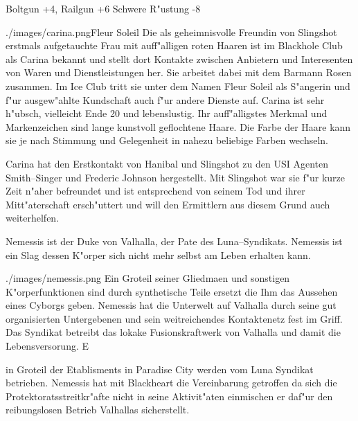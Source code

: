 \begin{nscsheet}[f]{\xls}
    \nscstats[ATT=9,AGG=10,EMP=4,KNO=4,HP=14]
    \nscruler
    \begin{nscinventory}
        \nscitem[Waffen] Boltgun +4, Railgun +6
        \nscitem[R"ustung] Schwere R"ustung -8
    \end{nscinventory}
\end{nscsheet}



\begin{sideimagebox}[r]{0.5}{./images/carina.png}{Fleur Soleil}
    Die als geheimnisvolle Freundin von Slingshot erstmals aufgetauchte Frau mit auff"alligen roten Haaren ist im Blackhole Club als Carina bekannt und stellt dort Kontakte zwischen Anbietern und Interesenten von Waren und Dienstleistungen her. Sie arbeitet dabei mit dem Barmann Rosen zusammen. Im Ice Club tritt sie unter dem Namen Fleur Soleil als S"angerin und f"ur ausgew"ahlte Kundschaft auch f"ur andere Dienste auf. Carina ist sehr h"ubsch, vielleicht Ende 20 und lebenslustig. Ihr auff"alligstes Merkmal und Markenzeichen sind lange kunstvoll geflochtene Haare. Die Farbe der Haare kann sie je nach Stimmung und Gelegenheit in nahezu beliebige Farben wechseln.

    Carina hat den Erstkontakt von Hanibal und Slingshot zu den USI Agenten Smith--Singer und Frederic Johnson hergestellt. Mit Slingshot war sie f"ur kurze Zeit n"aher befreundet und ist entsprechend von seinem Tod und ihrer Mitt"aterschaft ersch"uttert und will den Ermittlern aus diesem Grund auch weiterhelfen.
\end{sideimagebox}


Nemessis ist der Duke von Valhalla, der Pate des Luna--Syndikats. Nemessis ist ein Slag dessen K"orper sich nicht mehr selbst am Leben erhalten kann. 

\begin{sideimagebox}[r]{0.7}{./images/nemessis.png}{}
    Ein Gro\3teil seiner Gliedma\3en und sonstigen K"orperfunktionen sind durch synthetische Teile ersetzt die Ihm das Aussehen eines Cyborgs geben. Nemessis hat die Unterwelt auf Valhalla durch seine gut organisierten Untergebenen und sein weitreichendes Kontaktenetz
    fest im Griff. Das Syndikat betreibt das lokake Fusionskraftwerk von Valhalla und damit die Lebensversorung. E
\end{sideimagebox}

in Gro\3teil der Etablisments in Paradise City werden vom Luna Syndikat betrieben. Nemessis hat mit Blackheart die Vereinbarung getroffen da\3 sich die Protektoratsstreitkr"afte nicht in seine Aktivit"aten einmischen er daf"ur den reibungslosen Betrieb Valhallas sicherstellt.



